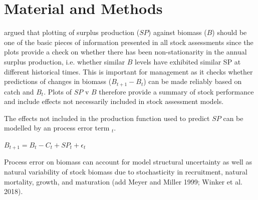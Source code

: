 \documentclass[12pt,doublespacing,a4paper]{ouparticle}
\begin{document}
\section{Material and Methods}

\cite{walters2008surplus} argued that plotting of surplus production ($SP$) against biomass ($B$) should be one of the basic pieces of information presented in all stock assessments since the plots provide a check on whether there has been non-stationarity in the annual surplus production, i.e. whether similar $B$ levels have exhibited similar SP at different historical times. This is important for management as it checks whether predictions of changes in biomass ($B_{t+1} - B_t$) can be made reliably based on catch and $B_t$. Plots of $SP$ v $B$ therefore provide a summary of stock performance and include effects not necessarily included in stock assessment models. 

The effects not included in the production function used to predict $SP$ can be modelled by an process error term \epsilon$_t$.

$B_{t+1}=B_t-C_t+SP_t+\epsilon_t$
 
 Process error on biomass can account for model structural uncertainty as well as natural variability of stock biomass due to stochasticity in recruitment, natural mortality, growth, and maturation \citep{francis2011data} (add Meyer and Miller 1999; Winker et al. 2018).


\end{document}
